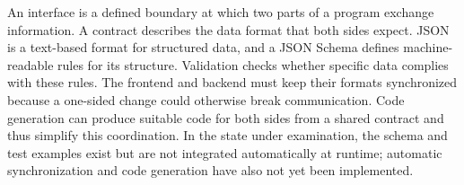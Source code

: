 \begin{beginnerstatement}

An interface is a defined boundary at which two parts of a program exchange
information. A contract describes the data format that both sides expect. JSON
is a text-based format for structured data, and a JSON Schema defines
machine-readable rules for its structure. Validation checks whether specific
data complies with these rules. The frontend and backend must keep their
formats synchronized because a one-sided change could otherwise break
communication. Code generation can produce suitable code for both sides from a
shared contract and thus simplify this coordination. In the state under
examination, the schema and test examples exist but are not integrated
automatically at runtime; automatic synchronization and code generation have
also not yet been implemented.

\end{beginnerstatement}
